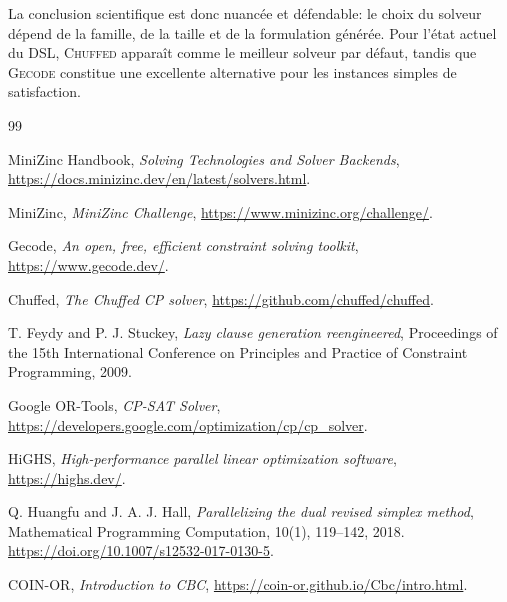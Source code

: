 \documentclass[12pt,a4paper]{article}
\newcommand{\solver}[1]{\textnormal{\textsc{#1}}}
\newcommand{\dsl}{\textnormal{\textsc{DSL}}}
\begin{document}
La conclusion scientifique est donc nuancée et défendable: le choix du solveur dépend de la famille, de la taille et de la formulation générée. Pour l'état actuel du \dsl{}, \solver{Chuffed} apparaît comme le meilleur solveur par défaut, tandis que \solver{Gecode} constitue une excellente alternative pour les instances simples de satisfaction.

\begin{thebibliography}{99}

MiniZinc Handbook,
\textit{Solving Technologies and Solver Backends},
\url{https://docs.minizinc.dev/en/latest/solvers.html}.

MiniZinc,
\textit{MiniZinc Challenge},
\url{https://www.minizinc.org/challenge/}.

Gecode,
\textit{An open, free, efficient constraint solving toolkit},
\url{https://www.gecode.dev/}.

Chuffed,
\textit{The Chuffed CP solver},
\url{https://github.com/chuffed/chuffed}.

T. Feydy and P. J. Stuckey,
\textit{Lazy clause generation reengineered},
Proceedings of the 15th International Conference on Principles and Practice of Constraint Programming, 2009.

Google OR-Tools,
\textit{CP-SAT Solver},
\url{https://developers.google.com/optimization/cp/cp_solver}.

HiGHS,
\textit{High-performance parallel linear optimization software},
\url{https://highs.dev/}.

Q. Huangfu and J. A. J. Hall,
\textit{Parallelizing the dual revised simplex method},
Mathematical Programming Computation, 10(1), 119--142, 2018.
\url{https://doi.org/10.1007/s12532-017-0130-5}.

COIN-OR,
\textit{Introduction to CBC},
\url{https://coin-or.github.io/Cbc/intro.html}.

\end{thebibliography}
\end{document}
